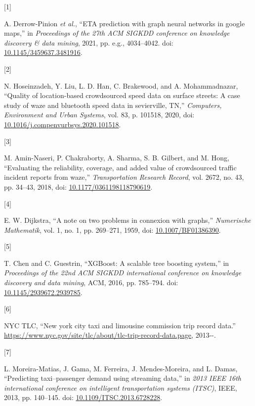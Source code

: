\documentclass[
  10pt,
  letterpaper,
  lettersize,
  journal]{IEEEtran}
\newlength{\cslhangindent}
\newlength{\csllabelwidth}
\newenvironment{CSLReferences}[2] %
 {\begin{list}{}{%
  \setlength{\itemindent}{0pt}
  \setlength{\leftmargin}{0pt}
  \setlength{\parsep}{0pt}
  \ifodd #1
   \setlength{\leftmargin}{\cslhangindent}
   \setlength{\itemindent}{-1\cslhangindent}
  \fi
  \setlength{\itemsep}{#2\baselineskip}}}
 {\end{list}}
\newcommand{\CSLLeftMargin}[1]{\parbox[t]{\csllabelwidth}{\strut#1\strut}}
\newcommand{\CSLRightInline}[1]{\parbox[t]{\linewidth - \csllabelwidth}{\strut#1\strut}}
\begin{document}
\label{refs}
\begin{CSLReferences}{0}{0}
\CSLLeftMargin{{[}1{]} }%
\CSLRightInline{A. Derrow-Pinion \emph{et al.}, {``ETA prediction with
graph neural networks in google maps,''} in \emph{Proceedings of the
27th ACM SIGKDD conference on knowledge discovery \& data mining}, 2021,
pp. e.g., 4034--4042. doi:
\href{https://doi.org/10.1145/3459637.3481916}{10.1145/3459637.3481916}.}

\CSLLeftMargin{{[}2{]} }%
\CSLRightInline{N. Hoseinzadeh, Y. Liu, L. D. Han, C. Brakewood, and A.
Mohammadnazar, {``Quality of location-based crowdsourced speed data on
surface streets: A case study of waze and bluetooth speed data in
sevierville, TN,''} \emph{Computers, Environment and Urban Systems},
vol. 83, p. 101518, 2020, doi:
\href{https://doi.org/10.1016/j.compenvurbsys.2020.101518}{10.1016/j.compenvurbsys.2020.101518}.}

\CSLLeftMargin{{[}3{]} }%
\CSLRightInline{M. Amin-Naseri, P. Chakraborty, A. Sharma, S. B.
Gilbert, and M. Hong, {``Evaluating the reliability, coverage, and added
value of crowdsourced traffic incident reports from waze,''}
\emph{Transportation Research Record}, vol. 2672, no. 43, pp. 34--43,
2018, doi:
\href{https://doi.org/10.1177/0361198118790619}{10.1177/0361198118790619}.}

\CSLLeftMargin{{[}4{]} }%
\CSLRightInline{E. W. Dijkstra, {``A note on two problems in connexion
with graphs,''} \emph{Numerische Mathematik}, vol. 1, no. 1, pp.
269--271, 1959, doi:
\href{https://doi.org/10.1007/BF01386390}{10.1007/BF01386390}.}

\CSLLeftMargin{{[}5{]} }%
\CSLRightInline{T. Chen and C. Guestrin, {``XGBoost: A scalable tree
boosting system,''} in \emph{Proceedings of the 22nd ACM SIGKDD
international conference on knowledge discovery and data mining}, ACM,
2016, pp. 785--794. doi:
\href{https://doi.org/10.1145/2939672.2939785}{10.1145/2939672.2939785}.}

\CSLLeftMargin{{[}6{]} }%
\CSLRightInline{NYC TLC, {``New york city taxi and limousine commission
trip record data.''}
\url{https://www.nyc.gov/site/tlc/about/tlc-trip-record-data.page},
2013-\/-.}

\CSLLeftMargin{{[}7{]} }%
\CSLRightInline{L. Moreira-Matias, J. Gama, M. Ferreira, J.
Mendes-Moreira, and L. Damas, {``Predicting taxi--passenger demand using
streaming data,''} in \emph{2013 IEEE 16th international conference on
intelligent transportation systems (ITSC)}, IEEE, 2013, pp. 140--145.
doi:
\href{https://doi.org/10.1109/ITSC.2013.6728228}{10.1109/ITSC.2013.6728228}.}


\end{CSLReferences}
\end{document}
